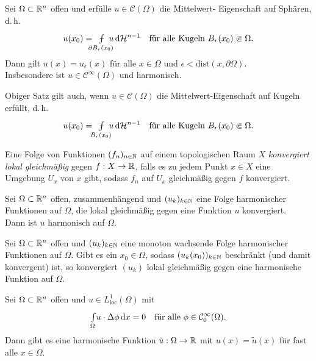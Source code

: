 \documentclass{cheat-sheet}
\def\Xint#1{\mathchoice
   {\XXint\displaystyle\textstyle{#1}}%
   {\XXint\textstyle\scriptstyle{#1}}%
   {\XXint\scriptstyle\scriptscriptstyle{#1}}%
   {\XXint\scriptscriptstyle\scriptscriptstyle{#1}}%
   \!\int}
\def\XXint#1#2#3{{\setbox0=\hbox{$#1{#2#3}{\int}$}
     \vcenter{\hbox{$#2#3$}}\kern-.5\wd0}}
\def\dashint{\Xint-}
\newcommand{\mymvint}[2]{{\textstyle \dashint\limits_{#1}^{#2}}}
\newcommand{\MVInt}[4]{\mymvint{#1}{#2} #3 \,\d #4}
\newcommand{\HM}{\mathcal{H}} %
\newcommand{\dist}{\mathrm{dist}} %
\begin{document}


\begin{satz}
  Sei $\Omega \subset \mathbb{R}^n$ offen und erfülle $u \in \mathcal{C}(\Omega)$ die Mittelwert- Eigenschaft auf Sphären, d.\,h.
  \[
    u(x_0) = \enspace\MVInt{\mathclap{\partial B_r(x_0)}}{}{\enspace u}{\HM^{n-1}}
    \quad \text{für alle Kugeln $B_r(x_0) \Subset \Omega$.}
  \]
  Dann gilt $u(x) = u_\epsilon(x)$ für alle $x \in \Omega$ und $\epsilon < \dist(x, \partial \Omega)$.\\
  Insbesondere ist $u \in \mathcal{C}^\infty(\Omega)$ und harmonisch.
\end{satz}

\begin{kor}
  Obiger Satz gilt auch, wenn $u \in \mathcal{C}(\Omega)$ die Mittelwert-Eigenschaft auf Kugeln erfüllt, d.\,h.
  \[
    u(x_0) = \enspace\MVInt{\mathclap{B_r(x_0)}}{}{\enspace u}{\HM^{n-1}}
    \quad \text{für alle Kugeln $B_r(x_0) \Subset \Omega$.}
  \]
\end{kor}

\begin{defn}
  Eine Folge von Funktionen $(f_n)_{n \in \mathbb{N}}$ auf einem topologischen Raum $X$ \emph{konvergiert lokal gleichmäßig} gegen $f : X \to \mathbb{R}$, falls es zu jedem Punkt $x \in X$ eine Umgebung $U_x$ von $x$ gibt, sodass $f_n$ auf $U_x$ gleichmäßig gegen $f$ konvergiert.
\end{defn}

\begin{kor}
  Sei $\Omega \subset \mathbb{R}^n$ offen, zusammenhängend und $(u_k)_{k \in \mathbb{N}}$ eine Folge harmonischer Funktionen auf $\Omega$, die lokal gleichmäßig gegen eine Funktion $u$ konvergiert.\\
  Dann ist $u$ harmonisch auf $\Omega$.
\end{kor}

\begin{kor}
  Sei $\Omega \subset \mathbb{R}^n$ offen und $(u_k)_{k \in \mathbb{N}}$ eine monoton wachsende Folge harmonischer Funktionen auf $\Omega$. Gibt es ein $x_0 \in \Omega$, sodass $(u_k(x_0))_{k \in \mathbb{N}}$ beschränkt (und damit konvergent) ist, so konvergiert $(u_k)$ lokal gleichmäßig gegen eine harmonische Funktion auf $\Omega$.
\end{kor}

\begin{satz}
  Sei $\Omega \subset \mathbb{R}^n$ offen und $u \in L_{\text{loc}}^1(\Omega)$ mit
  \[
    {\textstyle \int\limits_{\Omega}^{}} u \cdot \Delta \phi \,\mathrm{d} x = 0
    \quad \text{für alle $\phi \in \mathcal{C}_0^\infty(\Omega)$.}
  \]
  Dann gibt es eine harmonische Funktion $\tilde{u} : \Omega \to \mathbb{R}$ mit $u(x) = \tilde{u}(x)$ für fast alle $x \in \Omega$.
\end{satz}
\end{document}
